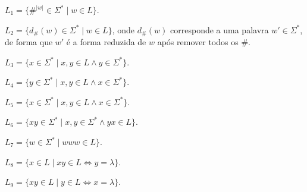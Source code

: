 \begin{exerList}
	\item $L_1 = \{\#^{|w|} \in \Sigma^* \mid w \in L\}$.
	\item $L_2 = \{d_{\#}(w) \in \Sigma^* \mid w \in L\}$, onde $d_{\#}(w)$ corresponde a uma palavra $w' \in \Sigma^*$, de forma que $w'$ é a forma reduzida de $w$ após remover todos os $\#$.
	\item $L_3 = \{x \in \Sigma^* \mid x,y \in L \land y \in \Sigma^*\}$.
	\item $L_4 = \{y \in \Sigma^* \mid x,y \in L \land x \in \Sigma^*\}$.
	\item $L_5 = \{x \in \Sigma^* \mid x,y \in L \land x \in \Sigma^*\}$.
	\item $L_6 = \{xy \in \Sigma^* \mid x,y \in \Sigma^* \land yx \in L\}$.
	\item $L_7 = \{w \in \Sigma^* \mid www \in L\}$.
	\item $L_8 = \{x \in L \mid xy \in L \Longleftrightarrow y = \lambda\}$.
	\item $L_9 = \{xy \in L \mid y \in L \Longleftrightarrow x = \lambda\}$.
\end{exerList}